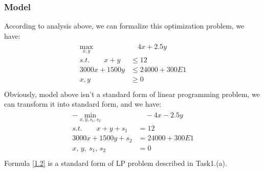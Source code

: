 \documentclass{article}
\begin{document}
        \subsubsection{Model}
            According to analysis above, we can formalize  this optimization problem, we have:
            \begin{align}\label{1.1}
            \begin{split}  
                \max_{x,y} &\quad 4x + 2.5y \\
                s.t.\qquad x + y &\leq 12 \\
                3000x + 1500y &\leq 24000 + 300E1 \\
                x,y &\geq 0 \\
            \end{split}    
            \end{align}      
            Obviously, model above isn't a standard form of linear programming problem, we can transform it into standard form, and we have:
            \begin{align}\label{1.2}
            \begin{split}  
                -\min_{x,y,s_1,s_2} &\quad -4x - 2.5y \\
                s.t.\qquad x + y + s_1 &= 12 \\
                3000x + 1500y +s_2 &= 24000 + 300E1 \\
                x,\,y,\:s_1,\,s_2 &= 0 \\
            \end{split}    
            \end{align}      
            Formula \eqref{1.2} is a standard form of LP problem described in Task1.(a).
\end{document}
